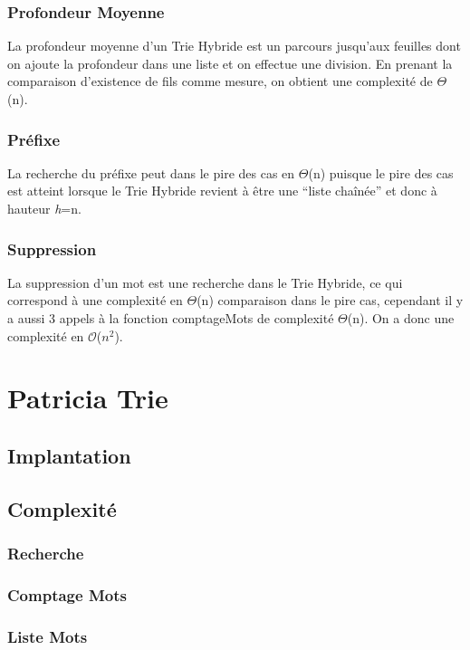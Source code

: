 \documentclass[a4paper,12pt]{report}
\begin{document}
\subsection{Profondeur Moyenne}
La profondeur moyenne d'un Trie Hybride est un parcours jusqu'aux feuilles dont on ajoute la profondeur dans une liste et on effectue
une division. En prenant la comparaison d'existence de fils comme mesure, on obtient une complexité de $\Theta$(n).

\subsection{Préfixe}
La recherche du préfixe peut dans le pire des cas en $\Theta$(n) puisque le pire des cas est atteint lorsque le Trie Hybride
revient à être une ``liste chaînée'' et donc à hauteur \textit{h}=n.

\subsection{Suppression}
La suppression d'un mot est une recherche dans le Trie Hybride, ce qui correspond à une complexité en $\Theta$(n) comparaison
dans le pire cas, cependant il y a aussi 3 appels à la fonction comptageMots de complexité $\Theta$(n).
On a donc une complexité en $\mathcal{O}$($n^2$).

\chapter{Patricia Trie}
\section{Implantation}
\section{Complexité}
\subsection{Recherche}


\subsection{Comptage Mots}

\subsection{Liste Mots}
\end{document}
